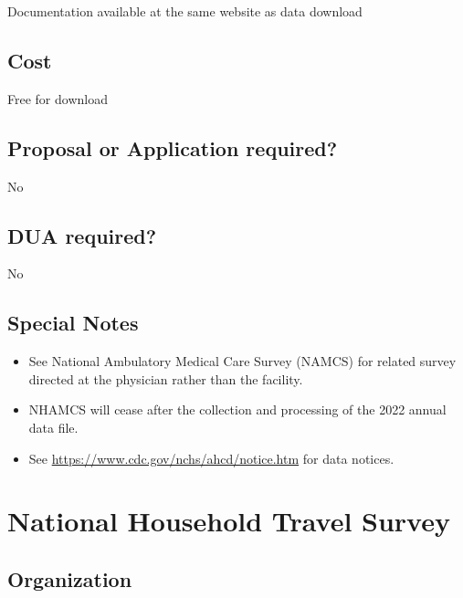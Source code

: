 \documentclass[
]{book}
\providecommand{\tightlist}{%
  \setlength{\itemsep}{0pt}\setlength{\parskip}{0pt}}
\begin{document}
Documentation available at the same website as data download

\hypertarget{cost-52}{%
\section{Cost}\label{cost-52}}

Free for download

\hypertarget{proposal-or-application-required-52}{%
\section{Proposal or Application required?}\label{proposal-or-application-required-52}}

No

\hypertarget{dua-required-52}{%
\section{DUA required?}\label{dua-required-52}}

No

\hypertarget{special-notes-52}{%
\section{Special Notes}\label{special-notes-52}}

\begin{itemize}
\tightlist
\item
  See National Ambulatory Medical Care Survey (NAMCS) for related survey directed at the physician rather than the facility.
\item
  NHAMCS will cease after the collection and processing of the 2022 annual data file.
\item
  See \url{https://www.cdc.gov/nchs/ahcd/notice.htm} for data notices.
\end{itemize}

\mainmatter

\hypertarget{national-household-travel-survey}{%
\chapter{National Household Travel Survey}\label{national-household-travel-survey}}

\hypertarget{organization-53}{%
\section{Organization}\label{organization-53}}
\end{document}
